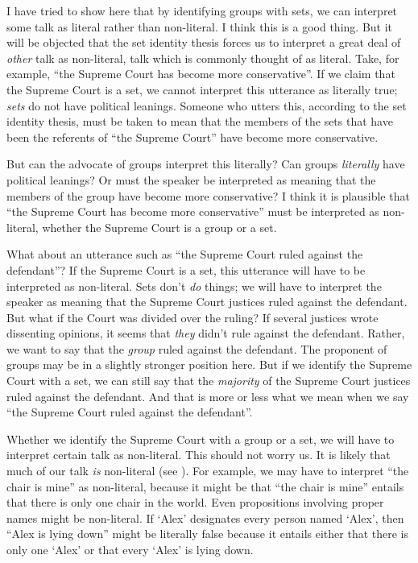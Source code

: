 \documentclass[11pt]{article}
\begin{document}
\begin{spacing}{1.5}
I have tried to show here that by identifying groups with sets, we can
interpret some talk as literal rather than non-literal.  I think this
is a good thing.  But it will be objected that the set identity thesis
forces us to interpret a great deal of {\em other} talk as
non-literal, talk which is commonly thought of as literal.  Take, for
example, ``the Supreme Court has become more conservative''.  If we
claim that the Supreme Court is a set, we cannot interpret this
utterance as literally true; {\em sets} do not have political
leanings.  Someone who utters this, according to the set identity
thesis, must be taken to mean that the members of the sets that have
been the referents of ``the Supreme Court'' have become more
conservative.

But can the advocate of groups interpret this literally?  Can groups
{\em literally} have political leanings?  Or must the speaker be
interpreted as meaning that the members of the group have become more
conservative?  I think it is plausible that ``the Supreme Court has
become more conservative'' must be interpreted as non-literal, whether
the Supreme Court is a group or a set.

What about an utterance such as ``the Supreme Court ruled against the
defendant''?  If the Supreme Court is a set, this utterance will have
to be interpreted as non-literal.  Sets don't {\em do} things; we will
have to interpret the speaker as meaning that the Supreme Court
justices ruled against the defendant.  But what if the Court was
divided over the ruling?  If several justices wrote dissenting
opinions, it seems that {\em they} didn't rule against the defendant.
Rather, we want to say that the {\em group} ruled against the
defendant.  The proponent of groups may be in a slightly stronger
position here.  But if we identify the Supreme Court with a set, we
can still say that the {\em majority} of the Supreme Court justices
ruled against the defendant.  And that is more or less what we mean
when we say ``the Supreme Court ruled against the defendant''.

Whether we identify the Supreme Court with a group or a set, we will
have to interpret certain talk as non-literal.  This should not worry
us.  It is likely that much of our talk {\em is} non-literal (see
\citet{bach1987}).  For example, we may have to interpret ``the chair
is mine'' as non-literal, because it might be that ``the chair is
mine'' entails that there is only one chair in the world.  Even
propositions involving proper names might be non-literal.  If `Alex'
designates every person named `Alex', then ``Alex is lying down''
might be literally false because it entails either that there is only
one `Alex' or that every `Alex' is lying down.


\end{spacing}
\end{document}
